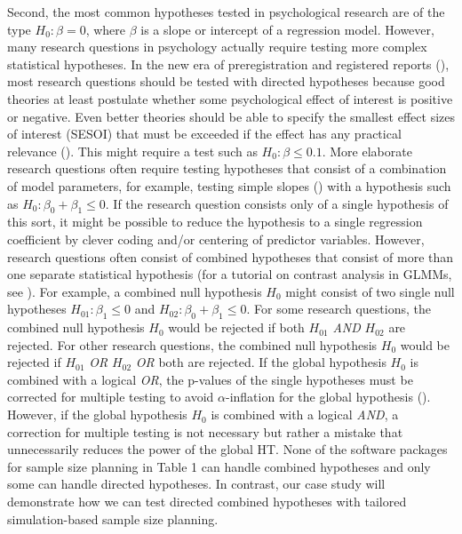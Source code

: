 \documentclass[
  man,
  floatsintext,
  longtable,
  a4paper,
  nolmodern,
  notxfonts,
  notimes,
  colorlinks=true,linkcolor=blue,citecolor=blue,urlcolor=blue]{apa7}
\begin{document}
Second, the most common hypotheses tested in psychological research are
of the type \(H_0: \beta = 0\), where \(\beta\) is a slope or intercept
of a regression model. However, many research questions in psychology
actually require testing more complex statistical hypotheses. In the new
era of preregistration and registered reports
(), most research questions should be tested with directed
hypotheses because good theories at least postulate whether some
psychological effect of interest is positive or negative. Even better
theories should be able to specify the smallest effect sizes of interest
(SESOI) that must be exceeded if the effect has any practical relevance
(). This might require a test such as
\(H_0: \beta \leq 0.1\). More elaborate research questions often require
testing hypotheses that consist of a combination of model parameters,
for example, testing simple slopes
() with a hypothesis such as \(H_0: \beta_0 + \beta_1 \leq 0\). If
the research question consists only of a single hypothesis of this sort,
it might be possible to reduce the hypothesis to a single regression
coefficient by clever coding and/or centering of predictor variables.
However, research questions often consist of combined hypotheses that
consist of more than one separate statistical hypothesis (for a tutorial
on contrast analysis in GLMMs, see
). For
example, a combined null hypothesis \(H_0\) might consist of two single
null hypotheses \(H_{01}: \beta_1 \leq 0\) and
\(H_{02}: \beta_0 + \beta_1 \leq 0\). For some research questions, the
combined null hypothesis \(H_0\) would be rejected if both \(H_{01}\)
\emph{AND} \(H_{02}\) are rejected. For other research questions, the
combined null hypothesis \(H_0\) would be rejected if \(H_{01}\)
\emph{OR} \(H_{02}\) \emph{OR} both are rejected. If the global
hypothesis \(H_0\) is combined with a logical \emph{OR}, the p-values of
the single hypotheses must be corrected for multiple testing to avoid
\(\alpha\)-inflation for the global hypothesis
(). However, if the global hypothesis \(H_0\) is
combined with a logical \emph{AND}, a correction for multiple testing is
not necessary but rather a mistake that unnecessarily reduces the power
of the global HT. None of the software packages for sample size planning
in Table 1 can handle combined hypotheses and only some can handle
directed hypotheses. In contrast, our case study will demonstrate how we
can test directed combined hypotheses with tailored simulation-based
sample size planning.
\end{document}
